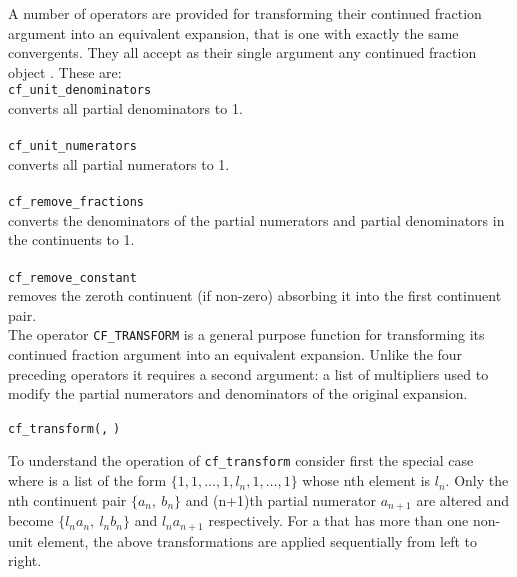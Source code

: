 \hypertarget{CF_UNIT_NUMERATORS:operator}{}
\hypertarget{CF_UNIT_DENOMINATORS:operator}{}
\hypertarget{CF_REMOVE_FRACTIONS:operator}{}
\hypertarget{CF_REMOVE_CONSTANT:operator}{}
A number of operators are provided for transforming their continued
fraction argument  into an equivalent expansion,
that is one with exactly the same convergents.
They all accept as their single argument any continued fraction
object .
These are:\\

\texttt{cf\_unit\_denominators}\\
converts all partial denominators to 1. \\\\
\texttt{cf\_unit\_numerators}\\
converts all partial numerators to 1. \\\\
\texttt{cf\_remove\_fractions}\\
converts the denominators of the partial numerators and partial
denominators in the continuents to 1.\\\\
\texttt{cf\_remove\_constant} \\
removes the zeroth continuent (if non-zero) absorbing it into the
first continuent pair.\\

\hypertarget{CF_TRANSFORM:operator}{}
The operator \texttt{CF\_TRANSFORM} is a general purpose function
for transforming its continued fraction argument  into
an equivalent expansion. Unlike the four preceding operators it requires
a second argument: a list of multipliers used to modify the partial
numerators and denominators of the original expansion.
\begin{syntaxtable}
  \texttt{cf\_transform(}\texttt{,}
  \texttt{)}
\end{syntaxtable}
To understand the operation of \texttt{cf\_transform} consider first the
special case where  is a list of the
form $\{1, 1, \ldots, 1, l_n, 1, \ldots, 1\}$ whose nth element is $l_n$.
Only the nth continuent pair $\{a_n,\ b_n\}$ and (n+1)th partial numerator
$a_{n+1}$ are altered and become $\{l_na_n,\ l_nb_n\}$ and $l_na_{n+1}$
respectively. For a  that has more than one non-unit
element, the above transformations are applied sequentially from left to
right.

